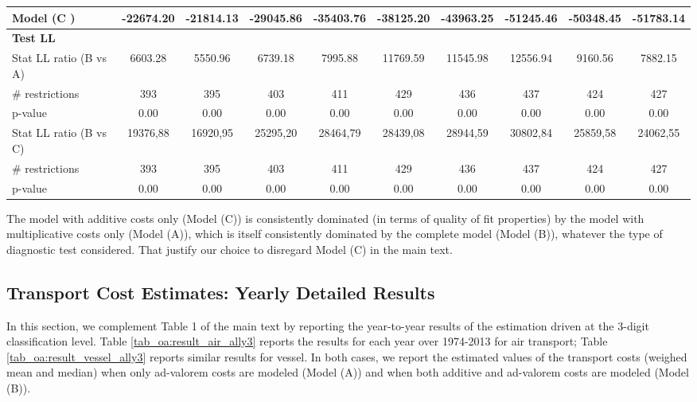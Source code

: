 \documentclass[11pt,twoside, authoryear]{elsarticle}
\begin{document}
\begin{landscape}
\begin{table}[htbp]
{\begin{tabular}{l|c c c c c c c c c}
    Model (C ) & -22674.20 & -21814.13 & -29045.86 & -35403.76 & -38125.20 & -43963.25 & -51245.46 & -50348.45 & -51783.14 \\ \hline
   \multicolumn{10}{l}{ \textbf{Test LL} } \\ \hline
    Stat LL ratio (B vs A) & 6603.28 & 5550.96 & 6739.18 & 7995.88 & 11769.59 & 11545.98 & 12556.94 & 9160.56 & 7882.15 \\
    $\#$ restrictions & 393   & 395   & 403   & 411   & 429   & 436   & 437   & 424   & 427 \\
    p-value & 0.00  & 0.00  & 0.00  & 0.00  & 0.00  & 0.00  & 0.00  & 0.00  & 0.00 \\ \hline
    Stat LL ratio (B vs C) & 19376,88 & 16920,95 & 25295,20 & 28464,79 & 28439,08 & 28944,59 & 30802,84 & 25859,58 & 24062,55 \\
    $\#$ restrictions & 393   & 395   & 403   & 411   & 429   & 436   & 437   & 424   & 427 \\
    p-value & 0.00  & 0.00  & 0.00  & 0.00  & 0.00  & 0.00  & 0.00  & 0.00  & 0.00 \\
\hline \hline
    \end{tabular}%
}
\end{table}%
\end{landscape}

The model with additive costs only (Model (C)) is consistently dominated (in terms of quality of fit properties) by the model with multiplicative costs only (Model (A)), which is itself consistently dominated by the complete model (Model (B)), whatever the type of diagnostic test considered. That justify our choice to disregard Model (C) in the main text.

\newpage
\setcounter{table}{0}
\renewcommand{\thetable}{B.\arabic{table}}

\subsection{Transport Cost Estimates: Yearly Detailed Results}
In this section, we complement Table 1 of the main text by reporting the year-to-year results of the estimation driven at the 3-digit classification level. Table \ref{tab_oa:result_air_ally3} reports the results for each year over 1974-2013 for air transport; Table \ref{tab_oa:result_vessel_ally3} reports similar results for vessel. In both cases, we report the estimated values of the transport costs (weighed mean and median) when only ad-valorem costs are modeled (Model (A)) and when both additive and ad-valorem costs are modeled (Model (B)).
\end{document}
